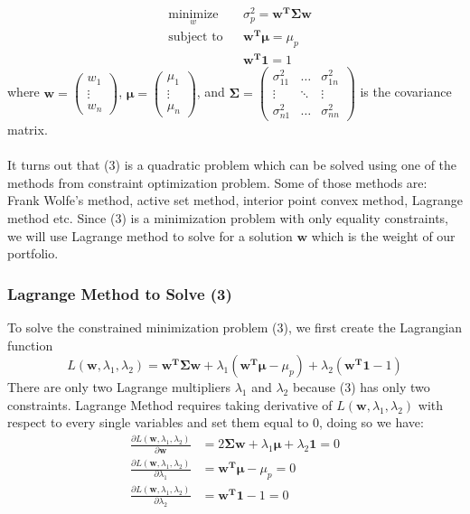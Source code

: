 \documentclass[12pt,titlepage,a4paper]{article}
\begin{document}
\begin{equation}
\begin{aligned}
& \underset{w}{\text{minimize}}
& &\sigma_p^2 = \mathbf{w^T\Sigma w}\\
& \text{subject to}
& & \mathbf{w^T\mu} = \mu_p \\
&&& \mathbf{w^T1}=1
\end{aligned}
\end{equation}
where $\mathbf{w} = \begin{pmatrix} w_1 \\ \vdots \\ w_n \end{pmatrix}$, 
$\mathbf{\mu} = \begin{pmatrix} \mu_1 \\ \vdots \\ \mu_n \end{pmatrix}$, 
and $\mathbf{\Sigma} = \begin{pmatrix}\sigma_{11}^2 & \dots & \sigma_{1n}^2 \\ \vdots & \ddots & \vdots\\  \sigma_{n1}^2 & \dots & \sigma_{nn}^2 \end{pmatrix}$ is the covariance matrix.\\ \\ 
It turns out that (3) is a quadratic problem which can be solved using one of the methods from constraint optimization problem. Some of those methods are: Frank Wolfe's method, active set method, interior point convex method, Lagrange method etc. Since (3) is a minimization problem with only equality constraints, we will use Lagrange method to solve for a solution $\mathbf{w}$ which is the weight of our portfolio. 

\subsubsection{Lagrange Method to Solve (3)}

To solve the constrained minimization problem (3), we first create the Lagrangian function 
$$
L(\mathbf{w}, \lambda_1, \lambda_2) = \mathbf{w^T\Sigma w} + \lambda_1(\mathbf{w^T\mu} - \mu_p) + \lambda_2(\mathbf{w^T1} - 1)
$$
There are only two Lagrange multipliers $\lambda_1$ and $\lambda_2$ because (3) has only two constraints. Lagrange Method requires taking derivative of $L(\mathbf{w}, \lambda_1, \lambda_2)$ with respect to every single variables and set them equal to 0, doing so we have: 
\begin{equation}
\begin{split}
\frac{\partial L(\mathbf{w}, \lambda_1, \lambda_2)}{\partial \mathbf{w}} &= 2\mathbf{\Sigma w} + \lambda_1\mathbf{\mu} + \lambda_2\mathbf{1} = 0 \\
\frac{\partial L(\mathbf{w}, \lambda_1, \lambda_2)}{\partial \lambda_1} &=  \mathbf{w^T\mu} - \mu_p = 0\\
\frac{\partial L(\mathbf{w}, \lambda_1, \lambda_2)}{\partial \lambda_2} &= \mathbf{w^T1} - 1 = 0\\
\end{split}
\end{equation}
\end{document}
